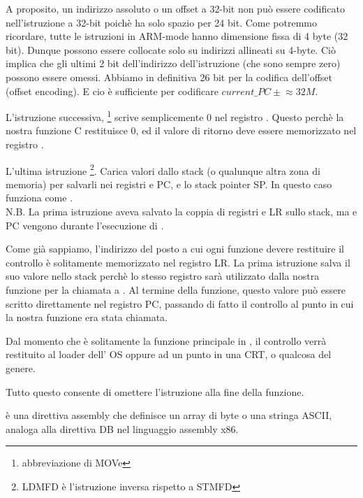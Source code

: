 A proposito, un indirizzo assoluto o un offset a 32-bit non può essere codificato nell'istruzione a 32-bit  poichè ha solo spazio per 24 bit.
Come potremmo ricordare, tutte le istruzioni in ARM-mode hanno dimensione fissa di 4 byte (32 bit).
Dunque possono essere collocate solo su indirizzi allineati su 4-byte.
Ciò implica che gli ultimi 2 bit dell'indirizzo dell'istruzione (che sono sempre zero) possono essere omessi.
Abbiamo in definitiva 26 bit per la codifica dell'offset (offset encoding). E cio è sufficiente per codificare $current\_PC \pm{} \approx{}32M$.

L'istruzione successiva, \footnote{abbreviazione di MOVe} scrive semplicemente 0 nel registro .
Questo perchè la nostra funzione C restituisce 0, ed il valore di ritorno deve essere memorizzato nel registro .

L'ultima istruzione \footnote{\ac{LDMFD} è l'istruzione inversa rispetto a \ac{STMFD}}.
Carica valori dallo stack (o qualunque altra zona di memoria) per salvarli nei registri  e \ac{PC}, e  lo \gls{stack pointer} \ac{SP}.
In questo caso funziona come \POP.\\
N.B. La prima istruzione  aveva salvato la coppia di registri  e \ac{LR} sullo stack, ma  e \ac{PC} vengono  durante l'esecuzione di .

Come già sappiamo, l'indirizzo del posto a cui ogni funzione devere restituire il controllo è solitamente memorizzato nel registro \ac{LR}.
La prima istruzione salva il suo valore nello stack perchè lo stesso registro sarà utilizzato dalla nostra funzione \main per la chiamata a \printf.
Al termine della funzione, questo valore può essere scritto direttamente nel registro \ac{PC}, passando di fatto il controllo al punto in cui la nostra funzione era stata chiamata.

Dal momento che \main è solitamente la funzione principale in \CCpp,
il controllo verrà restituito al loader dell' \ac{OS} oppure ad un punto in una \ac{CRT},
o qualcosa del genere.

Tutto questo consente di omettere l'istruzione  alla fine della funzione.

 è una direttiva assembly che definisce un array di byte o una stringa ASCII, analoga alla direttiva DB nel linguaggio assembly x86.
